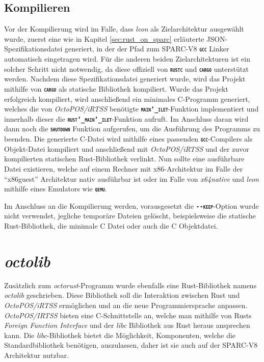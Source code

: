 \subsection{Kompilieren}

Vor der Kompilierung wird im Falle, dass \textit{leon} als Zielarchitektur ausgewählt wurde,
zuerst eine wie in Kapitel \ref{sec:rust_on_sparc} erläuterte
JSON-Spezifikationsdatei generiert,
in der der Pfad zum SPARC-V8 \texttt{\textsc{\textbf{gcc}}} Linker automatisch eingetragen wird.
Für die anderen beiden Zielarchitekturen ist ein solcher Schritt nicht notwendig,
da diese offiziell von \texttt{\textsc{\textbf{rustc}}} und \texttt{\textsc{\textbf{cargo}}} unterstützt werden. 
Nachdem diese Spezifikationsdatei generiert wurde, wird das Projekt mithilfe von \texttt{\textsc{\textbf{cargo}}}
als statische Bibliothek kompiliert.
Wurde das Projekt erfolgreich kompiliert, wird anschließend ein minimales C-Programm generiert,
welches die von \textit{OctoPOS/iRTSS} benötigte \texttt{\textsc{\textbf{main\char`_ilet}}}-Funktion implementiert
und innerhalb dieser die \texttt{\textsc{\textbf{rust\char`_main\char`_ilet}}}-Funktion aufruft.
Im Anschluss daran wird dann noch die \texttt{\textsc{\textbf{shutdown}}} Funktion aufgerufen, um die 
Ausführung des Programms zu beenden. Die generierte C-Datei wird mithilfe eines passenden
\texttt{\textsc{\textbf{gcc}}}-Compilers als Objekt-Datei kompiliert
und anschließend mit \textit{OctoPOS/iRTSS} und der zuvor kompilierten statischen Rust-Bibliothek verlinkt.
Nun sollte eine ausführbare Datei existieren, welche auf einem Rechner mit x86-Architektur im Falle der "`x86guest"' 
Architektur nativ ausführbar ist oder im Falle von \textit{x64native} und \textit{leon} mithilfe eines Emulators wie 
\texttt{\textsc{\textbf{qemu}}}.

Im Anschluss an die Kompilierung werden,
vorausgesetzt die \texttt{\textsc{\textbf{-{}-keep}}}-Option wurde nicht verwendet,
jegliche temporäre Dateien gelöscht, beispielsweise die statische Rust-Bibliothek,
die minimale C Datei oder auch die C Objektdatei.

\section{\textit{octolib}}\label{sec:octolib}

Zusätzlich zum \textit{octorust}-Programm wurde ebenfalls eine Rust-Bibliothek namens \textit{octolib} geschrieben. 
Diese Bibliothek soll die Interaktion zwischen Rust und \textit{OctoPOS/iRTSS} ermöglichen und an die neue 
Programmiersprache anpassen. \textit{OctoPOS/IRTSS} bieten eine C-Schnittstelle an, welche man mithilfe von Rusts
\textit{Foreign Function Interface} und der \textit{libc} Bibliothek aus Rust heraus ansprechen kann.
Die \textit{libc}-Bibliothek bietet die Möglichkeit, Komponenten, welche die Standardbibliothek benötigen, 
auszulassen, daher ist sie auch auf der SPARC-V8 Architektur nutzbar.

